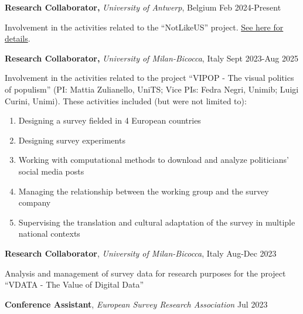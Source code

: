 \documentclass[10pt,]{article}
\providecommand{\tightlist}{%
  \setlength{\itemsep}{0pt}\setlength{\parskip}{0pt}}
\renewenvironment{itemize}{
  \begin{list}{}{
    \setlength{\leftmargin}{1.5em}
  }
}{
  \end{list}
}
\begin{document}
\begin{itemize}
\item
  \textbf{Research Collaborator,} \emph{University of Antwerp}, Belgium
  \hfill Feb 2024-Present

  \begin{itemize}
  \tightlist
  \item
    Involvement in the activities related to the ``NotLikeUS'' project.
    \href{https://notlikeus.be/}{See here for details}.
  \end{itemize}
\item
  \textbf{Research Collaborator,} \emph{University of Milan-Bicocca},
  Italy \hfill Sept 2023-Aug 2025

  \begin{itemize}
  \tightlist
  \item
    Involvement in the activities related to the project ``VIPOP - The
    visual politics of populism'' (PI: Mattia Zulianello, UniTS; Vice
    PIs: Fedra Negri, Unimib; Luigi Curini, Unimi). These activities
    included (but were not limited to):

    \begin{enumerate}
    \def\labelenumi{\alph{enumi})}
    \item
      Designing a survey fielded in 4 European countries
    \item
      Designing survey experiments
    \item
      Working with computational methods to download and analyze
      politicians' social media posts
    \item
      Managing the relationship between the working group and the survey
      company
    \item
      Supervising the translation and cultural adaptation of the survey
      in multiple national contexts
    \end{enumerate}
  \end{itemize}
\item
  \textbf{Research Collaborator}, \emph{University of Milan-Bicocca},
  Italy \hfill Aug-Dec 2023

  \begin{itemize}
  \tightlist
  \item
    Analysis and management of survey data for research purposes for the
    project ``VDATA - The Value of Digital Data''
  \end{itemize}
\item
  \textbf{Conference Assistant}, \emph{European Survey Research
  Association} \hfill Jul 2023


\end{itemize}
\end{document}
